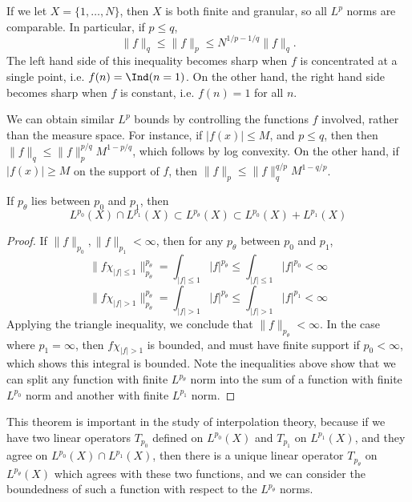 \begin{remark}
  If we let $X = \{ 1, \dots, N \}$, then $X$ is both finite and granular, so all $L^p$ norms are comparable. In particular, if $p \leq q$,
  \[ \| f \|_q \leq \| f \|_p \leq N^{1/p - 1/q} \| f \|_q. \]
  The left hand side of this inequality becomes sharp when $f$ is concentrated at a single point, i.e. $f(n) = \Ind(n = 1)$. On the other hand, the right hand side becomes sharp when $f$ is constant, i.e. $f(n) = 1$ for all $n$.
\end{remark}

\begin{example}
    We can obtain similar $L^p$ bounds by controlling the functions $f$ involved, rather than the measure space. For instance, if $|f(x)| \leq M$, and $p \leq q$, then then $\| f \|_q \leq \| f \|_p^{p/q} M^{1 - p/q}$, which follows by log convexity. On the other hand, if $|f(x)| \geq M$ on the support of $f$, then $\| f \|_p \leq \| f \|_q^{q/p} M^{1-q/p}$.
\end{example}

\begin{theorem}
  If $p_\theta$ lies between $p_0$ and $p_1$, then
  \[ L^{p_0}(X) \cap L^{p_1}(X) \subset L^{p_\theta}(X) \subset L^{p_0}(X) + L^{p_1}(X) \]
\end{theorem}
\begin{proof}
  If $\| f \|_{p_0}, \| f \|_{p_1} < \infty$, then for any $p_\theta$ between $p_0$ and $p_1$,
  \[ \| f \chi_{|f| \leq 1} \|_{p_\theta}^{p_\theta} = \int_{|f| \leq 1} |f|^{p_\theta} \leq \int_{|f| \leq 1} |f|^{p_0} < \infty \]
  \[ \| f \chi_{|f| > 1} \|_{p_\theta}^{p_\theta} = \int_{|f| > 1} |f|^{p_\theta} \leq \int_{|f| > 1} |f|^{p_1} < \infty \]
  Applying the triangle inequality, we conclude that $\| f \|_{p_\theta} < \infty$. In the case where $p_1 = \infty$, then $f \chi_{|f| > 1}$ is bounded, and must have finite support if $p_0 < \infty$, which shows this integral is bounded. Note the inequalities above show that we can split any function with finite $L^{p_\theta}$ norm into the sum of a function with finite $L^{p_0}$ norm and another with finite $L^{p_1}$ norm.
\end{proof}

\begin{remark}
  This theorem is important in the study of interpolation theory, because if we have two linear operators $T_{p_0}$ defined on $L^{p_0}(X)$ and $T_{p_1}$ on $L^{p_1}(X)$, and they agree on $L^{p_0}(X) \cap L^{p_1}(X)$, then there is a unique linear operator $T_{p_\theta}$ on $L^{p_\theta}(X)$ which agrees with these two functions, and we can consider the boundedness of such a function with respect to the $L^{p_\theta}$ norms.
\end{remark}

